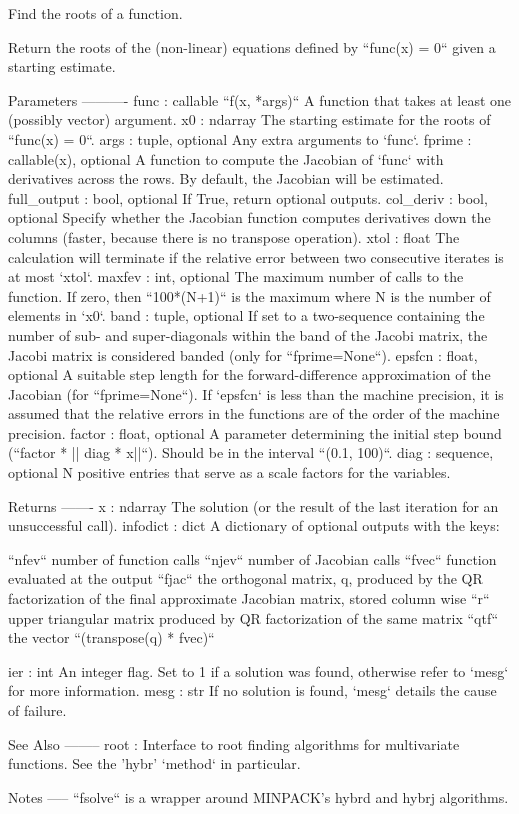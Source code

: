 \begin{DoxyVerb}Find the roots of a function.

Return the roots of the (non-linear) equations defined by
``func(x) = 0`` given a starting estimate.

Parameters
----------
func : callable ``f(x, *args)``
    A function that takes at least one (possibly vector) argument.
x0 : ndarray
    The starting estimate for the roots of ``func(x) = 0``.
args : tuple, optional
    Any extra arguments to `func`.
fprime : callable(x), optional
    A function to compute the Jacobian of `func` with derivatives
    across the rows. By default, the Jacobian will be estimated.
full_output : bool, optional
    If True, return optional outputs.
col_deriv : bool, optional
    Specify whether the Jacobian function computes derivatives down
    the columns (faster, because there is no transpose operation).
xtol : float
    The calculation will terminate if the relative error between two
    consecutive iterates is at most `xtol`.
maxfev : int, optional
    The maximum number of calls to the function. If zero, then
    ``100*(N+1)`` is the maximum where N is the number of elements
    in `x0`.
band : tuple, optional
    If set to a two-sequence containing the number of sub- and
    super-diagonals within the band of the Jacobi matrix, the
    Jacobi matrix is considered banded (only for ``fprime=None``).
epsfcn : float, optional
    A suitable step length for the forward-difference
    approximation of the Jacobian (for ``fprime=None``). If
    `epsfcn` is less than the machine precision, it is assumed
    that the relative errors in the functions are of the order of
    the machine precision.
factor : float, optional
    A parameter determining the initial step bound
    (``factor * || diag * x||``).  Should be in the interval
    ``(0.1, 100)``.
diag : sequence, optional
    N positive entries that serve as a scale factors for the
    variables.

Returns
-------
x : ndarray
    The solution (or the result of the last iteration for
    an unsuccessful call).
infodict : dict
    A dictionary of optional outputs with the keys:

    ``nfev``
        number of function calls
    ``njev``
        number of Jacobian calls
    ``fvec``
        function evaluated at the output
    ``fjac``
        the orthogonal matrix, q, produced by the QR
        factorization of the final approximate Jacobian
        matrix, stored column wise
    ``r``
        upper triangular matrix produced by QR factorization
        of the same matrix
    ``qtf``
        the vector ``(transpose(q) * fvec)``

ier : int
    An integer flag.  Set to 1 if a solution was found, otherwise refer
    to `mesg` for more information.
mesg : str
    If no solution is found, `mesg` details the cause of failure.

See Also
--------
root : Interface to root finding algorithms for multivariate
functions. See the 'hybr' `method` in particular.

Notes
-----
``fsolve`` is a wrapper around MINPACK's hybrd and hybrj algorithms.\end{DoxyVerb}
